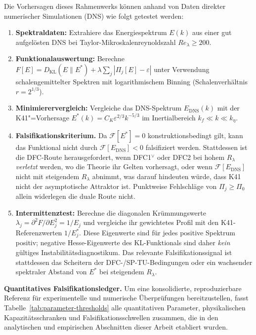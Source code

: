 \documentclass[12pt,a4paper]{article}
\theoremstyle{breakdef}
\theoremstyle{breakplain}
\theoremstyle{breakdef}
\begin{document}
Die Vorhersagen dieses Rahmenwerks können anhand von Daten direkter numerischer Simulationen (DNS) wie folgt getestet werden:

\begin{enumerate}
\item \textbf{Spektraldaten:} Extrahiere das Energiespektrum $E(k)$ aus einer gut aufgelösten DNS bei Taylor-Mikroskalenreynoldszahl $Re_\lambda \geq 200$.

\item \textbf{Funktionalauswertung:} Berechne $F[E] = D_{\mathrm{KL}}(E \| E^*) + \lambda \sum_j |\Pi_j[E] - \varepsilon|$ unter Verwendung schalengemittelter Spektren mit logarithmischem Binning (Schalenverhältnis $r = 2^{1/3}$).

\item \textbf{Minimierervergleich:} Vergleiche das DNS-Spektrum $E_{\mathrm{DNS}}(k)$ mit der K41"=Vorhersage $E^*(k) = C_K \varepsilon^{2/3} k^{-5/3}$ im Inertialbereich $k_f \ll k \ll k_\eta$.

\item \textbf{Falsifikationskriterium.}
  Da $\mathcal{F}[E^*] = 0$ konstruktionsbedingt gilt, kann das
  Funktional nicht durch $\mathcal{F}[E_{\mathrm{DNS}}] < 0$
  falsifiziert werden. Stattdessen ist die DFC-Route herausgefordert,
  wenn DFC1$^\vee$ oder DFC2 bei hohem $R_\lambda$ \emph{verletzt}
  werden, wo die Theorie ihr Gelten vorhersagt, oder wenn
  $\mathcal{F}[E_{\mathrm{DNS}}]$ nicht mit steigendem $R_\lambda$
  abnimmt, was darauf hindeuten würde, dass K41 nicht der asymptotische
  Attraktor ist. Punktweise Fehlschläge von $\Pi_j\ge\Pi_0$ allein
  widerlegen die duale Route nicht.

\item \textbf{Intermittenztest:} Berechne die diagonalen Krümmungswerte
  $\lambda_j = \partial^2 F/\partial E_j^2 = 1/E_j$ und vergleiche ihr
  gewichtetes Profil mit den K41-Referenzwerten $1/E_j^*$. Diese Eigenwerte
  sind für jedes positive Spektrum positiv; negative Hesse-Eigenwerte des
  KL-Funktionals sind daher \emph{kein} gültiges Instabilitätsdiagnostikum.
  Das relevante Falsifikationssignal ist stattdessen das Scheitern der
  DFC-/SP-TU-Bedingungen oder ein wachsender spektraler Abstand von $E^*$
  bei steigendem $R_\lambda$.
\end{enumerate}

\medskip\noindent
\textbf{Quantitatives Falsifikationsledger.}\quad
Um eine konsolidierte, reproduzierbare Referenz für experimentelle und numerische Überprüfungen bereitzustellen, fasst Tabelle~\ref{tab:parameter-thresholds} alle quantitativen Parameter, physikalischen Kapazitätsschranken und Falsifikationsschwellen zusammen, die in den analytischen und empirischen Abschnitten dieser Arbeit etabliert wurden.
\end{document}

